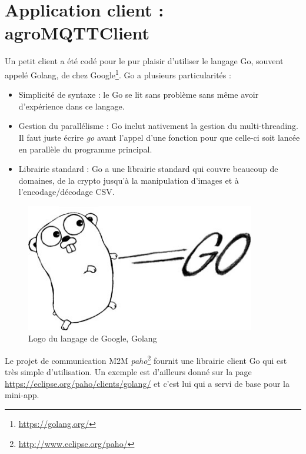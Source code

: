 \section{Application client : agroMQTTClient}
Un petit client a été codé pour le pur plaisir d'utiliser le langage Go, souvent appelé Golang, de chez Google\footnote{\url{https://golang.org/}}. Go a plusieurs particularités : 
\begin{itemize}
	\item Simplicité de syntaxe : le Go se lit sans problème sans même avoir d'expérience dans ce langage.
	\item Gestion du parallélisme : Go inclut nativement la gestion du multi-threading. Il faut juste écrire \textit{go} avant l'appel d'une fonction pour que celle-ci soit lancée en parallèle du programme principal.
	\item Librairie standard : Go a une librairie standard qui couvre beaucoup de domaines,  de la crypto jusqu'à la manipulation d'images et à l'encodage/décodage CSV. 
\end{itemize}

\begin{figure}[H]
	\begin{center}
		\includegraphics[width=10cm]{img/google-go-logo.jpg}
		\caption{Logo du langage de Google, Golang}
		\label{golang}
	\end{center}
\end{figure}

Le projet de communication M2M \textit{paho}\footnote{\url{http://www.eclipse.org/paho/}} fournit une librairie client Go qui est très simple d'utilisation. Un exemple est d'ailleurs donné sur la page \url{https://eclipse.org/paho/clients/golang/} et c'est lui qui a servi de base pour la mini-app. \\

